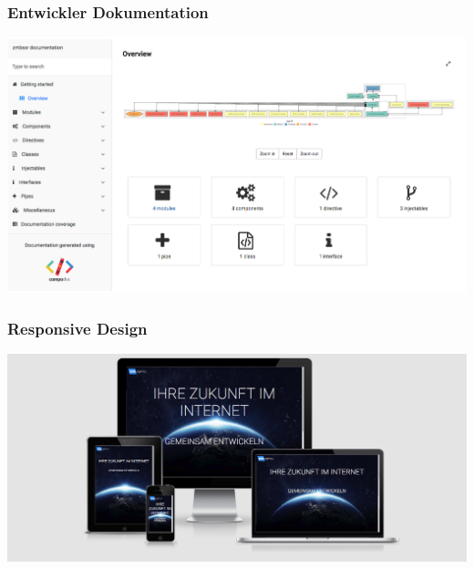 \documentclass[11pt,a4paper]{article}
\begin{document}
\subsubsection{Entwickler Dokumentation}
\label{sec:doku}
\includegraphics[scale=0.3]{compodoc}
\subsubsection{Responsive Design}
\label{sec:responsive}
\includegraphics[scale=0.3]{responsive}
\end{document}
